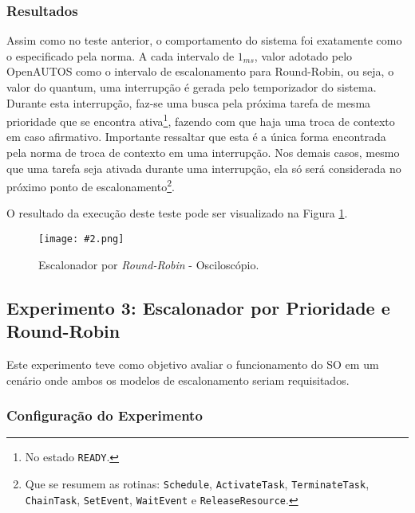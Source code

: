 \documentclass[conference,compsoc]{IEEEtran}
\newcommand{\reffig}[1]{Figura \ref{fig:#1}}
\newcommand{\figura}[5][Extraido de:]{
	\begin{figure}[h!tb]
		\centering
		\caption{#3.}
		\texttt{[image: \#2.png]}
		\ifthenelse{\isempty{#5}}{}{%
			\\ #1 \cite{#5}.
		}	
		\label{fig:#2}
	\end{figure}
}
\begin{document}

\subsubsection{Resultados}

Assim como no teste anterior, o comportamento do sistema foi exatamente como o especificado pela norma. A cada intervalo de $1_{ms}$, valor adotado pelo OpenAUTOS como o intervalo de escalonamento para Round-Robin, ou seja, o valor do quantum, uma interrupção é gerada pelo temporizador do sistema. Durante esta interrupção, faz-se uma busca pela próxima tarefa de mesma prioridade que se encontra ativa\footnote{No estado \texttt{READY}.}, fazendo com que haja uma troca de contexto em caso afirmativo. Importante ressaltar que esta é a única forma encontrada pela norma de troca de contexto em uma interrupção. Nos demais casos, mesmo que uma tarefa seja ativada durante uma interrupção, ela só será considerada no próximo ponto de escalonamento\footnote{Que se resumem as rotinas: \texttt{Schedule}, \texttt{ActivateTask}, \texttt{TerminateTask}, \texttt{ChainTask}, \texttt{SetEvent}, \texttt{WaitEvent} e \texttt{ReleaseResource}.}.

O resultado da execução deste teste pode ser visualizado na \reffig{cap5_scheduler_rr_osc}.

\figura{cap5_scheduler_rr_osc}{Escalonador por \emph{Round-Robin} - Osciloscópio}{6cm}{}



\subsection{Experimento 3: Escalonador por Prioridade e Round-Robin}

Este experimento teve como objetivo avaliar o funcionamento do SO em um cenário onde ambos os modelos de escalonamento seriam requisitados.

\subsubsection{Configuração do Experimento}
\end{document}
